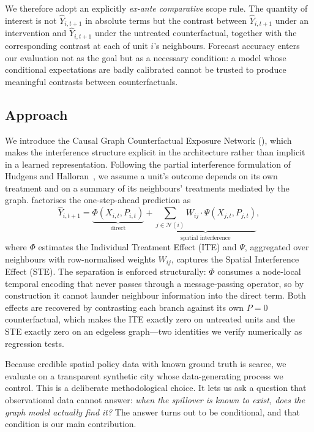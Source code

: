 We therefore adopt an explicitly \emph{ex-ante comparative} scope rule. The
quantity of interest is not $\hat{Y}_{i,t+1}$ in absolute terms but the
contrast between $\hat{Y}_{i,t+1}$ under an intervention and
$\hat{Y}_{i,t+1}$ under the untreated counterfactual, together with the
corresponding contrast at each of unit $i$'s neighbours. Forecast accuracy
enters our evaluation not as the goal but as a necessary condition: a model
whose conditional expectations are badly calibrated cannot be trusted to
produce meaningful contrasts between counterfactuals.

\subsection{Approach}

We introduce the Causal Graph Counterfactual Exposure Network (\CGCEN{}), which
makes the interference structure explicit in the architecture rather than
implicit in a learned representation. Following the partial interference
formulation of Hudgens and Halloran~\cite{hudgens2008}, we assume a unit's
outcome depends on its own treatment and on a summary of its neighbours'
treatments mediated by the graph. \CGCEN{} factorises the one-step-ahead
prediction as
\begin{equation}
  \hat{Y}_{i,t+1} = \underbrace{\Phi(X_{i,t}, P_{i,t})}_{\text{direct}}
  + \underbrace{\sum_{j \in \mathcal{N}(i)} W_{ij} \cdot
  \Psi(X_{j,t}, P_{j,t})}_{\text{spatial interference}} ,
  \label{eq:decomposition-intro}
\end{equation}
where $\Phi$ estimates the Individual Treatment Effect (ITE) and $\Psi$,
aggregated over neighbours with row-normalised weights $W_{ij}$, captures the
Spatial Interference Effect (STE). The separation is enforced structurally:
$\Phi$ consumes a node-local temporal encoding that never passes through a
message-passing operator, so by construction it cannot launder neighbour
information into the direct term. Both effects are recovered by contrasting
each branch against its own $P = 0$ counterfactual, which makes the ITE exactly
zero on untreated units and the STE exactly zero on an edgeless graph---two
identities we verify numerically as regression tests.

Because credible spatial policy data with known ground truth is scarce, we
evaluate on a transparent synthetic city whose data-generating process we
control. This is a deliberate methodological choice. It lets us ask a question
that observational data cannot answer: \emph{when the spillover is known to
exist, does the graph model actually find it?} The answer turns out to be
conditional, and that condition is our main contribution.

